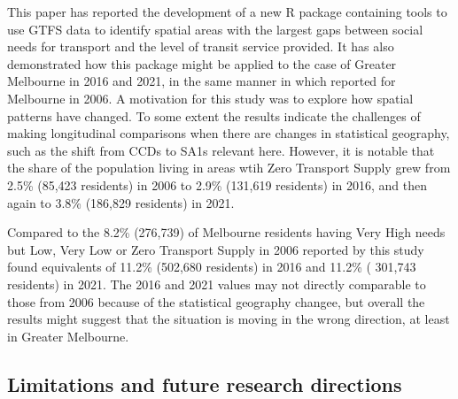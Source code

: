 \documentclass[preprint, 3p,
authoryear]{elsarticle} %
\begin{document}
This paper has reported the development of a new R package containing
tools to use GTFS data to identify spatial areas with the largest gaps
between social needs for transport and the level of transit service
provided. It has also demonstrated how this package might be applied to
the case of Greater Melbourne in 2016 and 2021, in the same manner in
which \citet{currie2010identifying} reported for Melbourne in 2006. A
motivation for this study was to explore how spatial patterns have
changed. To some extent the results indicate the challenges of making
longitudinal comparisons when there are changes in statistical
geography, such as the shift from CCDs to SA1s relevant here. However,
it is notable that the share of the population living in areas wtih Zero
Transport Supply grew from 2.5\% (85,423 residents) in 2006 to 2.9\%
(131,619 residents) in 2016, and then again to 3.8\% (186,829 residents)
in 2021.

Compared to the 8.2\% (276,739) of Melbourne residents having Very High
needs but Low, Very Low or Zero Transport Supply in 2006 reported by
\citet{currie2010identifying} this study found equivalents of 11.2\%
(502,680 residents) in 2016 and 11.2\% ( 301,743 residents) in 2021. The
2016 and 2021 values may not directly comparable to those from 2006
because of the statistical geography changee, but overall the results
might suggest that the situation is moving in the wrong direction, at
least in Greater Melbourne.

\subsection{Limitations and future research
directions}\label{limitations-and-future-research-directions}
\end{document}
